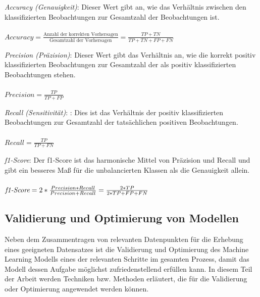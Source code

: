 \begin{description}
    \item \textit{Accuracy (Genauigkeit)}: Dieser Wert gibt an, wie das Verhältnis zwischen den klassifizierten Beobachtungen zur Gesamtzahl der Beobachtungen ist.
    \\
    \\
    $Accuracy = \frac{\text{Anzahl der korrekten Vorhersagen}}{\text{Gesamtzahl der Vorhersagen}} = \frac{TP+TN}{TP+TN+FP+FN}$

    \item \textit{Precision (Präzision)}: Dieser Wert gibt das Verhältnis an, wie die korrekt positiv klassifizierten Beobachtungen zur Gesamtzahl der als positiv klassifizierten Beobachtungen stehen.
    \\
    \\
    $Precision = \frac{TP}{TP+FP}$

    \item \textit{Recall (Sensitivität)}: : Dies ist das Verhältnis der positiv klassifizierten Beobachtungen zur Gesamtzahl der tatsächlichen positiven Beobachtungen.
    \\
    \\
    $Recall = \frac{TP}{TP+FN}$
    
    \item \textit{ f1-Score}: Der f1-Score ist das harmonische Mittel von Präzision und Recall und gibt ein besseres Maß für die unbalancierten Klassen als die Genauigkeit allein.
    \\
    \\
    $\textit{\text{f1-Score}} = 2 * \frac{Precision * Recall}{Precision + Recall} = \frac{2*TP}{2*TP + FP + FN}$
\end{description}

\pagebreak

\subsection{Validierung und Optimierung von Modellen}

Neben dem Zusammentragen von relevanten Datenpunkten für die Erhebung eines geeigneten Datensatzes ist die Validierung und Optimierung des Machine Learning Modells eines der relevanten Schritte im gesamten Prozess, damit das Modell dessen Aufgabe möglichst zufriedenstellend erfüllen kann. 
In diesem Teil der Arbeit werden Techniken bzw. Methoden erläutert, die für die Validierung oder Optimierung angewendet werden können.


